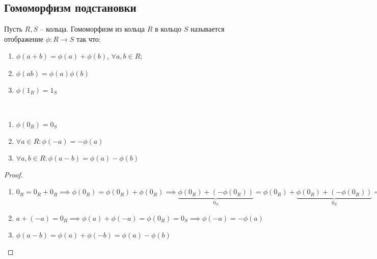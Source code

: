 \subsection{Гомоморфизм подстановки}

\begin{defn}
    Пусть $R, S$ -- кольца. Гомоморфизм из кольца $R$ в кольцо $S$ называется отображение $\phi: R \to S$ так что:

    \begin{enumerate}
        \item $\phi(a + b) = \phi(a) + \phi(b)$, $\forall a, b \in R$;
        
        \item $\phi(ab) = \phi(a) \phi(b)$
        
        \item $\phi(1_R) = 1_S$
    \end{enumerate}
\end{defn}

\begin{theorem-non} ~

    \begin{enumerate}    
        \item $\phi(0_R) = 0_S$
        
        \item $\forall a \in R: \phi(-a) = -\phi(a)$
        
        \item $\forall a, b \in R: \phi(a - b) = \phi(a) - \phi(b)$ 
    \end{enumerate}
\end{theorem-non}

\begin{proof}
    \begin{enumerate}
        \item $0_R = 0_R + 0_R \implies \phi(0_R) = \phi(0_R) + \phi(0_R) \implies \underbrace{\phi(0_R) + (-\phi(0_R))}_{0_S} = \phi(0_R) + \underbrace{\phi(0_R) + (-\phi(0_R))}_{0_S} \implies 0_S = \phi(0_R) + 0_S \implies \phi(0_R) = 0_S$

        \item $a + (-a) = 0_R \implies \phi(a) + \phi(-a) = \phi(0_R) = 0_S \implies \phi(-a) = -\phi(a)$
        
        \item $\phi(a - b) = \phi(a) + \phi(-b) = \phi(a) - \phi(b)$
    \end{enumerate}
\end{proof}

